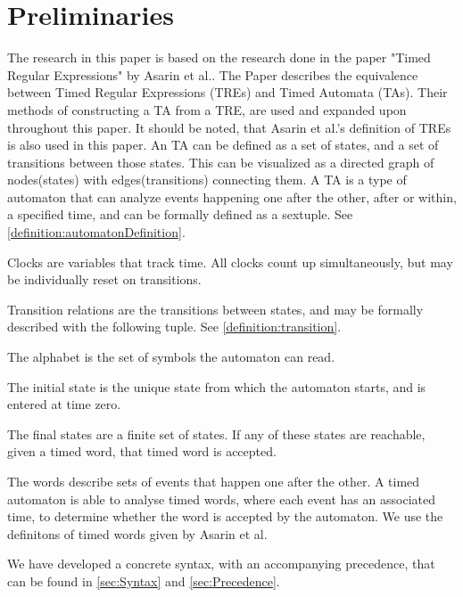 \section{Preliminaries}\label{sec:preliminaries}






The research in this paper is based on the research done in the paper "Timed Regular Expressions" by Asarin et al.\cite{Eugene2001}. The Paper describes the equivalence between Timed Regular Expressions (TREs) and Timed Automata (TAs). Their methods of constructing a TA from a TRE, are used and expanded upon throughout this paper. It should be noted, that Asarin et al.'s definition of TREs is also used in this paper.
An TA can be defined as a set of states, and a set of transitions between those states. This can be visualized as a directed graph of nodes(states) with edges(transitions) connecting them.
A TA is a type of automaton that can analyze events happening one after the other, after or within, a specified time, and can be formally defined as a sextuple\cite{ALUR1994}. See \cref{definition:automatonDefinition}.


Clocks are variables that track time. All clocks count up simultaneously, but may be individually reset on transitions.

Transition relations are the transitions between states, and may be formally described with the following tuple. See \cref{definition:transition}.


The alphabet is the set of symbols the automaton can read.

The initial state is the unique state from which the automaton starts, and is entered at time zero.

The final states are a finite set of states. If any of these states are reachable, given a timed word, that timed word is accepted.

The words describe sets of events that happen one after the other. A timed automaton is able to analyse timed words, where each event has an associated time, to determine whether the word is accepted by the automaton. We use the definitons of timed words given by Asarin et al. \cite{Eugene2001}

We have developed a concrete syntax, with an accompanying precedence, that can be found in \cref{sec:Syntax} and \cref{sec:Precedence}.
